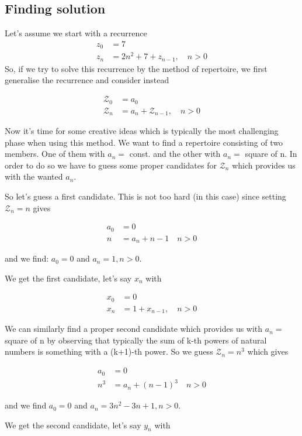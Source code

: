 \subsection{Finding solution}
Let's assume we start with a recurrence
\begin{align*}
z_0&=7\\
z_n&=2n^2+7+z_{n-1},\quad n>0\tag{1}
\end{align*}
So, if we try to solve this recurrence by the method of repertoire, we first generalise the recurrence and consider instead

\begin{align*}
\mathcal{Z}_0&=a_0\\
\mathcal{Z}_n&=a_n+\mathcal{Z}_{n-1},\quad n>0
\end{align*}

Now it's time for some creative ideas which is typically the most challenging phase when using this method. We want to find a repertoire consisting of two members. One of them with $a_n=$ const. and the other with $a_n=$ square of n. In order to do so we have to guess some proper candidates for $\mathcal{Z}_n$ which provides us with the wanted $a_n$.

So let's guess a first candidate. This is not too hard (in this case) since setting $\mathcal{Z}_n=n$ gives

\begin{align*}
a_0&=0\\
n&=a_n+n-1\quad n>0
\end{align*}

and we find: $a_0=0$ and $a_n=1,n>0$.

We get the first candidate, let's say $x_n$ with

\begin{align*}
x_0&=0\\
x_n&=1+x_{n-1},\quad n>0\tag{2}
\end{align*}

We can similarly find a proper second candidate which provides us with $a_n=$ square of n by observing that typically the sum of k-th powers of natural numbers is something with a (k+1)-th power. So we guess $\mathcal{Z}_n=n^3$ which gives

\begin{align*}
a_0&=0\\
n^3&=a_n+(n-1)^3\quad n>0
\end{align*}

and we find $a_0=0$ and $a_n=3n^2-3n+1,n>0$.

We get the second candidate, let's say $y_n$ with

